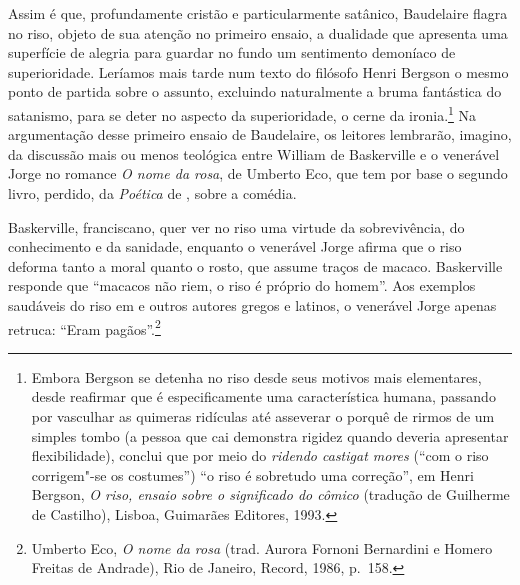 Assim é que, profundamente cristão e particularmente satânico,
Baudelaire flagra no riso, objeto de sua atenção no primeiro ensaio, a
dualidade que apresenta uma superfície de alegria para guardar no fundo
um sentimento demoníaco de superioridade. Leríamos mais tarde num texto
do filósofo Henri Bergson o mesmo ponto de partida sobre o assunto,
excluindo naturalmente a bruma fantástica do satanismo, para se deter
no aspecto da superioridade, o cerne da ironia.\footnote{ Embora Bergson	
se detenha no riso desde seus motivos mais elementares, desde reafirmar
que é especificamente uma característica humana, passando por vasculhar
as quimeras ridículas até asseverar o porquê de rirmos de um simples
tombo (a pessoa que cai demonstra rigidez quando deveria apresentar
flexibilidade), conclui que por meio do \textit{ridendo castigat mores}
(“com o riso corrigem"-se os costumes”) “o riso é sobretudo uma
correção”, em Henri Bergson, \textit{O riso, ensaio sobre o
significado do cômico} (tradução de Guilherme de Castilho),  Lisboa,		
Guimarães Editores, 1993.} Na argumentação desse primeiro ensaio de
Baudelaire, os leitores lembrarão, imagino, da discussão mais ou menos
teológica entre William de Baskerville e o venerável Jorge no romance
\textit{O nome da rosa}, de Umberto Eco, que tem por base o segundo
livro, perdido, da \textit{Poética} de , sobre a comédia. 

Baskerville, franciscano, quer ver no riso uma virtude da sobrevivência,
do conhecimento e da sanidade, enquanto o venerável Jorge afirma que o
riso deforma tanto a moral quanto o rosto, que assume traços de macaco.
Baskerville responde que “macacos não riem, o riso é próprio do homem”.
Aos exemplos saudáveis do riso em  e outros autores gregos e
latinos, o venerável Jorge apenas retruca: “Eram pagãos”.\footnote{ Umberto Eco,
 \textit{O nome da rosa} (trad. Aurora Fornoni Bernardini
e Homero Freitas de Andrade), Rio de Janeiro, Record, 1986, p.~158.}

